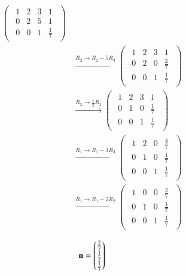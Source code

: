 \documentclass[journal]{IEEEtran}
\begin{document}
\begin{align}
\begin{pmatrix}
\begin{array}{ccc|c}
1 & 2 & 3 & 1\\
0 & 2 & 5 & 1\\
0 & 0 & 1 & \tfrac{1}{7}
\end{array}
\end{pmatrix} \\[4pt]
&\xrightarrow{R_2 \to R_2 - 5R_3}
\begin{pmatrix}
\begin{array}{ccc|c}
1 & 2 & 3 & 1\\
0 & 2 & 0 & \tfrac{2}{7}\\
0 & 0 & 1 & \tfrac{1}{7}
\end{array}
\end{pmatrix} \\[4pt]
&\xrightarrow{R_2 \to \tfrac{1}{2}R_2}
\begin{pmatrix}
\begin{array}{ccc|c}
1 & 2 & 3 & 1\\
0 & 1 & 0 & \tfrac{1}{7}\\
0 & 0 & 1 & \tfrac{1}{7}
\end{array}
\end{pmatrix} \\[4pt]
&\xrightarrow{R_1 \to R_1 - 3R_3}
\begin{pmatrix}
\begin{array}{ccc|c}
1 & 2 & 0 & \tfrac{4}{7}\\
0 & 1 & 0 & \tfrac{1}{7}\\
0 & 0 & 1 & \tfrac{1}{7}
\end{array}
\end{pmatrix} \\[4pt]
&\xrightarrow{R_1 \to R_1 - 2R_2}
\begin{pmatrix}
\begin{array}{ccc|c}
1 & 0 & 0 & \tfrac{2}{7}\\
0 & 1 & 0 & \tfrac{1}{7}\\
0 & 0 & 1 & \tfrac{1}{7}
\end{array}
\end{pmatrix}
\end{align}

\begin{align}
\mathbf{n}=
\begin{pmatrix}\frac{2}{7}
       \\
       \frac{1}{7}
       \\
       \frac{1}{7}
\end{pmatrix}
\end{align}
\end{document}
